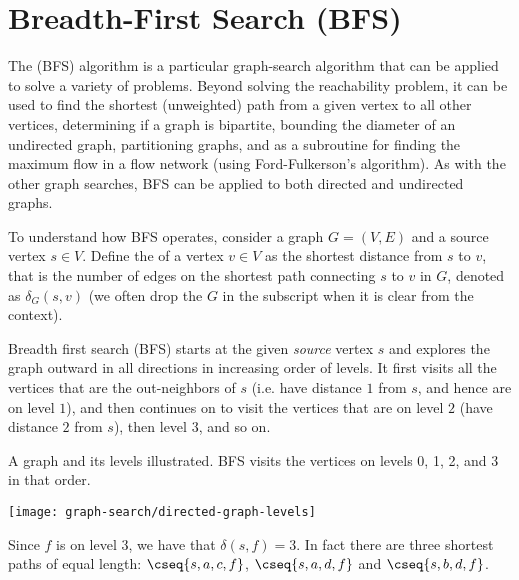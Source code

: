 
\section{Breadth-First Search (BFS) }
\label{sec:bfs}
\label{sec:gs::bfs}

\newcommand{\bfs}{\ttt{BFS}}

The  (BFS) algorithm is a particular graph-search algorithm that
can be applied to solve a variety of problems.  Beyond solving the
reachability problem, it can be used to find the shortest (unweighted)
path from a given vertex to all other vertices, determining if a graph
is bipartite, bounding the diameter of an undirected graph,
partitioning graphs, and as a subroutine for finding the maximum flow
in a flow network (using Ford-Fulkerson's algorithm).  As with the
other graph searches, BFS can be applied to both directed and
undirected graphs.

To understand how BFS operates, consider a graph $G = (V,E)$ and a
source vertex $s \in V$.  Define the  of a vertex $v \in V$ as the shortest distance from
$s$ to $v$, that is the number of edges on the shortest path
connecting $s$ to $v$ in $G$, denoted as $\delta_G(s,v)$ (we often drop the
$G$ in the subscript when it is clear from the context).

Breadth first search (BFS) starts at the given \emph{source}
vertex $s$ and explores the graph outward in all directions in
increasing order of levels. It first visits all the vertices that are
the out-neighbors of $s$ (i.e. have distance $1$ from $s$, and hence
are
on level $1$), and then
continues on to visit the vertices that are on level $2$ (have distance $2$ from $s$),
then level $3$, and so on.

\begin{example}
\label{ex:bfs::levels-simple}
A graph and its levels illustrated.  BFS visits the vertices on levels
0, 1, 2, and 3 in that order.   
\vspace{-.1in}
\begin{center}
\texttt{[image: graph-search/directed-graph-levels]}
\end{center}
\vspace{-.1in}
Since $f$ is on level $3$, we have that $\delta(s,f) = 3$.   In fact
there are three shortest
paths of equal length: $\cseq{s,a,c,f}$, $\cseq{s,a,d,f}$ and $\cseq{s,b,d,f}$.
\end{example}

